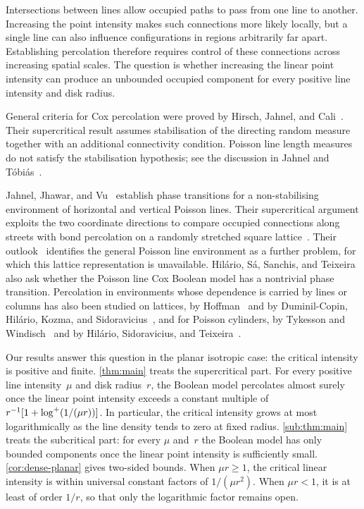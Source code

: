 \documentclass[11pt,letterpaper]{article}
\begin{document}
Intersections between lines allow occupied paths to pass from one line to another. Increasing the point intensity makes such connections more likely locally, but a single line can also influence configurations in regions arbitrarily far apart. Establishing percolation therefore requires control of these connections across increasing spatial scales. The question is whether increasing the linear point intensity can produce an unbounded occupied component for every positive line intensity and disk radius.

General criteria for Cox percolation were proved by Hirsch, Jahnel, and Cali~\cite[Section~2.1]{HJC19}. Their supercritical result assumes stabilisation of the directing random measure together with an additional connectivity condition. Poisson line length measures do not satisfy the stabilisation hypothesis; see the discussion in Jahnel and T\'obi\'as~\cite[Section~3]{JT22}.

Jahnel, Jhawar, and Vu~\cite{JJV23} establish phase transitions for a non-stabilising environment of horizontal and vertical Poisson lines. Their supercritical argument exploits the two coordinate directions to compare occupied connections along streets with bond percolation on a randomly stretched square lattice~\cite[Sections~1.3 and~2]{JJV23}. Their outlook~\cite[Section~1.4]{JJV23} identifies the general Poisson line environment as a further problem, for which this lattice representation is unavailable. Hil\'ario, S\'a, Sanchis, and Teixeira~\cite[Section~9]{HSST26} also ask whether the Poisson line Cox Boolean model has a nontrivial phase transition. Percolation in environments whose dependence is carried by lines or columns has also been studied on lattices, by Hoffman~\cite{Hof05} and by Duminil-Copin, Hil\'ario, Kozma, and Sidoravicius~\cite{DHKS18}, and for Poisson cylinders, by Tykesson and Windisch~\cite{TW12} and by Hil\'ario, Sidoravicius, and Teixeira~\cite{HST15}.

Our results answer this question in the planar isotropic case: the critical intensity is positive and finite. \cref{thm:main} treats the supercritical part. For every positive line intensity~$\mu$ and disk radius~$r$, the Boolean model percolates almost surely once the linear point intensity exceeds a constant multiple of $r^{-1}[1+\log^{+}(1/(\mu r))]$. In particular, the critical intensity grows at most logarithmically as the line density tends to zero at fixed radius. \cref{sub:thm:main} treats the subcritical part: for every $\mu$ and~$r$ the Boolean model has only bounded components once the linear point intensity is sufficiently small. \cref{cor:dense-planar} gives two-sided bounds. When $\mu r\ge1$, the critical linear intensity is within universal constant factors of $1/(\mu r^2)$. When $\mu r<1$, it is at least of order $1/r$, so that only the logarithmic factor remains open.
\end{document}
